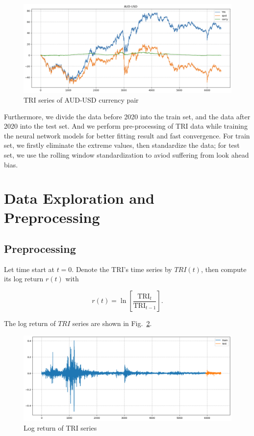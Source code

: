 \documentclass[runningheads]{llncs}
\begin{document}

\begin{figure}[htbp]
    \centering
    \includegraphics[width=\textwidth]{../img/tri.png}
    \caption{TRI series of AUD-USD currency pair}
    \label{fig:2}
\end{figure}

Furthermore, we divide the data before 2020 into the train set, and the data after 2020 into the test set. And we perform pre-processing of TRI data while training the neural network models for better fitting result and fast convergence. For train set, we firstly eliminate the extreme values, then standardize the data; for test set, we use the rolling window standardization to aviod suffering from look ahead bias.

\section{Data Exploration and Preprocessing}

\subsection{Preprocessing}

Let time start at $t = 0$. Denote the TRI's time series by $TRI(t)$, then compute its log return $r(t)$ with

$$
    r(t) = \ln \left[\frac{\mbox{TRI}_t}{\mbox{TRI}_{t-1}}\right].
$$

The log return of $TRI$ series are shown in Fig.~\ref{fig:3}.


\begin{figure}[htbp]
    \centering
    \includegraphics[width=\textwidth]{../img/log_return.png}
    \caption{Log return of TRI series}
    \label{fig:3}
\end{figure}
\end{document}
